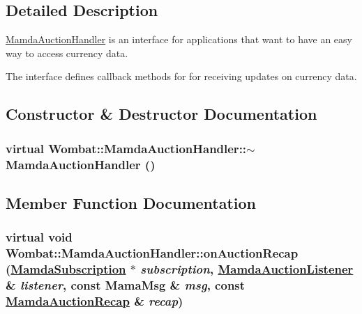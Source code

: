 \subsection{Detailed Description}
\hyperlink{classWombat_1_1MamdaAuctionHandler}{Mamda\-Auction\-Handler} is an interface for applications that want to have an easy way to access currency data. 

The interface defines callback methods for for receiving updates on currency data. 



\subsection{Constructor \& Destructor Documentation}
\hypertarget{classWombat_1_1MamdaAuctionHandler_e293d223852deea28b9c41cfde5c7d3f}{
\subsubsection[$\sim$MamdaAuctionHandler]{\setlength{\rightskip}{0pt plus 5cm}virtual Wombat::Mamda\-Auction\-Handler::$\sim$Mamda\-Auction\-Handler ()}}
\label{classWombat_1_1MamdaAuctionHandler_e293d223852deea28b9c41cfde5c7d3f}




\subsection{Member Function Documentation}
\hypertarget{classWombat_1_1MamdaAuctionHandler_2e59d05ab16c4fb329abff8b3381b5f9}{
\subsubsection[onAuctionRecap]{\setlength{\rightskip}{0pt plus 5cm}virtual void Wombat::Mamda\-Auction\-Handler::on\-Auction\-Recap (\hyperlink{classWombat_1_1MamdaSubscription}{Mamda\-Subscription} $\ast$ {\em subscription}, \hyperlink{classWombat_1_1MamdaAuctionListener}{Mamda\-Auction\-Listener} \& {\em listener}, const Mama\-Msg \& {\em msg}, const \hyperlink{classWombat_1_1MamdaAuctionRecap}{Mamda\-Auction\-Recap} \& {\em recap})}}
\label{classWombat_1_1MamdaAuctionHandler_2e59d05ab16c4fb329abff8b3381b5f9}


